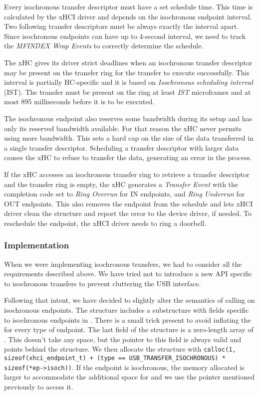 Every isochronous transfer descriptor must have a set schedule time. This time
is calculated by the xHCI driver and depends on the isochronous endpoint interval.
Two following transfer descriptors must be always exactly the interval apart.
Since isochronous endpoints can have up to 4-second interval, we need to
track the \textit{MFINDEX Wrap Events} to correctly determine the schedule.

The xHC gives its driver strict deadlines when an isochronous transfer descriptor
may be present on the transfer ring for the transfer to execute successfully.
This interval is partially HC-specific and it is based on \textit{Isochronous
scheduling interval} (IST). The transfer must be present on the ring at least
\textit{IST} microframes and at most 895 milliseconds before it is to be
executed.

The isochronous endpoint also reserves some bandwidth during its setup and has
only its reserved bandwidth available. For that reason the xHC never permits using
more bandwidth. This sets a hard cap on the size of the data transferred in a
single transfer descriptor. Scheduling a transfer descriptor with larger data
causes the xHC to refuse to transfer the data, generating an error in the process.

If the xHC accesses an isochronous transfer ring to retrieve a transfer
descriptor and the transfer ring is empty, the xHC generates a \textit{Transfer Event}
with the completion code set to \textit{Ring Overrun} for IN endpoints, and
\textit{Ring Underrun} for OUT endpoints. This also removes the endpoint from
the schedule and lets xHCI driver clean the structure and report the error to the device
driver, if needed. To reschedule the endpoint, the xHCI driver needs to ring a
doorbell.

\subsubsection{Implementation}

When we were implementing isochronous transfers, we had to consider all the
requirements described above. We have tried not to introduce a new API specific to
isochronous transfers to prevent cluttering the USB interface.

Following that intent, we have decided to slightly alter the
semantics of calling  on isochronous
endpoints. The  structure includes a substructure with
fields specific to isochronous endpoints in . There is a
small trick present to avoid inflating the  for every
type of endpoint. The last field of the structure is a zero-length array of
. This doesn't take any space, but the pointer to this
field is always valid and points behind the structure. We then allocate the
structure with \texttt{calloc(1, sizeof(xhci\_endpoint\_t) + (type ==
USB\_TRANSFER\_ISOCHRONOUS) * sizeof(*ep->isoch))}. If the endpoint is
isochronous, the memory allocated is larger to accommodate the additional space for
 and we use the pointer mentioned previously to access it.

